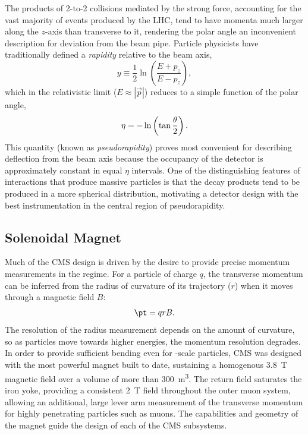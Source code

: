 The products of 2-to-2 collisions mediated by the strong force, accounting for the vast majority of events produced by the LHC, tend to have momenta much larger along the $z$-axis than transverse to it, rendering the polar angle an inconvenient description for deviation from the beam pipe.  Particle physicists have traditionally defined a \emph{rapidity} relative to the beam axis,
\begin{equation}
  y \equiv \frac{1}{2}\ln\left(\frac{E + p_z}{E - p_z}\right),
\end{equation}
which in the relativistic limit ($E \approx |\vec{p}|$) reduces to a simple function of the polar angle,
\begin{equation}
  \label{eq:pseudorapidity}
  \eta = - \ln\left(\tan{\theta \over 2}\right).
\end{equation}
This quantity (known as \emph{pseudorapidity}) proves most convenient for describing deflection from the beam axis because the occupancy of the detector is approximately constant in equal $\eta$ intervals.  One of the distinguishing features of interactions that produce massive particles is that the decay products tend to be produced in a more spherical distribution, motivating a detector design with the best instrumentation in the central region of pseudorapidity.

\subsection{Solenoidal Magnet}
Much of the CMS design is driven by the desire to provide precise momentum measurements in the \TeV regime.  For a particle of charge $q$, the transverse momentum can be inferred from the radius of curvature of its trajectory ($r$) when it moves through a magnetic field $B$:
\begin{equation}
  \label{eq:curvature}
  \pt = q r B.
\end{equation}
The resolution of the radius measurement depends on the amount of curvature, so as particles move towards higher energies, the momentum resolution degrades.  In order to provide sufficient bending even for \TeV-scale particles, CMS was designed with the most powerful magnet built to date, sustaining a homogenous \SI{3.8}{T} magnetic field over a volume of more than \SI{300}{m^3}.  The return field saturates the iron yoke, providing a consistent \SI{2}{T} field throughout the outer muon system, allowing an additional, large lever arm measurement of the transverse momentum for highly penetrating particles such as muons.  The capabilities and geometry of the magnet guide the design of each of the CMS subsystems.

